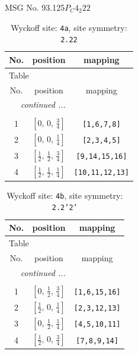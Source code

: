 \documentclass[fleqn,8pt]{jsarticle}
\begin{document}
\setcounter{MaxMatrixCols}{32}

\renewcommand{\tablename}{Table~}
\renewcommand{\figurename}{Figure~}
\begin{center}
\LARGE
MSG No. 93.125\quad$P_{C}4_{2}22$
\end{center}
\renewcommand{\arraystretch}{1.2}
\begin{longtable}{ccc}
\caption{Wyckoff site: {\tt 4a}, site symmetry: {\tt 2.22}}
 \\
 \hline \hline
No. & position & mapping \\ \hline \endfirsthead

\multicolumn{2}{l}{\tablename\ \thetable{}} \\
 \hline \hline
No. & position & mapping \\ \hline \endhead

 \hline \hline
\multicolumn{2}{r}{\footnotesize\it continued ...} \\ \endfoot

 \hline \hline
\multicolumn{2}{r}{} \\ \endlastfoot

1 & $\left[ 0,\, 0,\, \frac{3}{4} \right]$ & {\tt [1,6,7,8]} \\ \hline
2 & $\left[ 0,\, 0,\, \frac{1}{4} \right]$ & {\tt [2,3,4,5]} \\ \hline
3 & $\left[ \frac{1}{2},\, \frac{1}{2},\, \frac{3}{4} \right]$ & {\tt [9,14,15,16]} \\ \hline
4 & $\left[ \frac{1}{2},\, \frac{1}{2},\, \frac{1}{4} \right]$ & {\tt [10,11,12,13]} \\
\end{longtable}
\renewcommand{\arraystretch}{1.2}
\begin{longtable}{ccc}
\caption{Wyckoff site: {\tt 4b}, site symmetry: {\tt 2.2'2'}}
 \\
 \hline \hline
No. & position & mapping \\ \hline \endfirsthead

\multicolumn{2}{l}{\tablename\ \thetable{}} \\
 \hline \hline
No. & position & mapping \\ \hline \endhead

 \hline \hline
\multicolumn{2}{r}{\footnotesize\it continued ...} \\ \endfoot

 \hline \hline
\multicolumn{2}{r}{} \\ \endlastfoot

1 & $\left[ 0,\, \frac{1}{2},\, \frac{3}{4} \right]$ & {\tt [1,6,15,16]} \\ \hline
2 & $\left[ \frac{1}{2},\, 0,\, \frac{1}{4} \right]$ & {\tt [2,3,12,13]} \\ \hline
3 & $\left[ 0,\, \frac{1}{2},\, \frac{1}{4} \right]$ & {\tt [4,5,10,11]} \\ \hline
4 & $\left[ \frac{1}{2},\, 0,\, \frac{3}{4} \right]$ & {\tt [7,8,9,14]} \\
\end{longtable}
\end{document}
